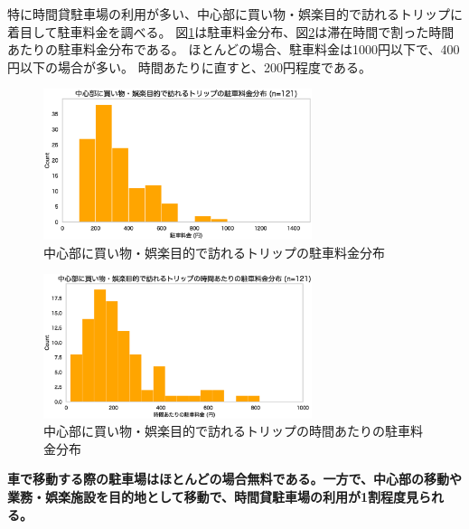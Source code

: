 \documentclass[a4paper,12pt, uplatex]{jsbook}
\begin{document}
\clearpage
特に時間貸駐車場の利用が多い、中心部に買い物・娯楽目的で訪れるトリップに着目して駐車料金を調べる。
図\ref{fig:parking_fee}は駐車料金分布、図\ref{fig:parking_fee_per_hour}は滞在時間で割った時間あたりの駐車料金分布である。
ほとんどの場合、駐車料金は1000円以下で、400円以下の場合が多い。
時間あたりに直すと、200円程度である。
%
\begin{figure}[H]
    \centering
    \includegraphics[width=0.7\textwidth]{picture/parking_fee.eps}
    \caption{中心部に買い物・娯楽目的で訪れるトリップの駐車料金分布}
    \label{fig:parking_fee}
\end{figure}
%
\begin{figure}[H]
    \centering
    \includegraphics[width=0.7\textwidth]{picture/parking_fee_per_hour.eps}
    \caption{中心部に買い物・娯楽目的で訪れるトリップの時間あたりの駐車料金分布}
    \label{fig:parking_fee_per_hour}
\end{figure}

\color{red}
\begin{framed}
\noindent
\textbf{\large 車で移動する際の駐車場はほとんどの場合無料である。一方で、中心部の移動や業務・娯楽施設を目的地として移動で、時間貸駐車場の利用が1割程度見られる。
}
\end{framed}
\color{black}


\clearpage
\end{document}
